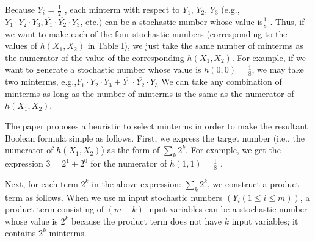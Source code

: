 \documentclass[10pt,conference]{IEEEtran}
\begin{document}
\par
Because $Y_i$ = $\frac{1}{2}$ , each minterm with respect to $Y_1$, $Y_2$, $Y_3$
(e.g., $Y_1 \cdot Y_2 \cdot Y_3, \overline{Y_1}\cdot\overline{Y_2}\cdot Y_3$, etc.) can be a stochastic number
whose value is$\frac{1}{8}$ . Thus, if we want to make each of the four
stochastic numbers (corresponding to the values of $h(X_1, X_2)$
in Table I), we just take the same number of minterms as the
numerator of the value of the corresponding $h(X_1, X_2)$. For
example, if we want to generate a stochastic number whose
value is $h(0, 0) = \frac{1}{8}$, we may take two minterms, e.g.,$Y_1\cdot Y_2 \cdot Y_3 + \overline{Y_1}\cdot\overline{Y_2}\cdot Y_3$ We can take any combination of minterms as
long as the number of minterms is the same as the numerator
of $h(X_1, X_2)$.

\par
The paper \cite{fifteen} proposes a heuristic to select minterms in
order to make the resultant Boolean formula simple as follows.
First, we express the target number (i.e., the numerator of
$h(X_1, X_2)$) as the form of $\sum_{k} 2^{k}$. For example, we get the
expression $3 = 2^1 + 2^0$ for the numerator of $h(1, 1) = \frac{1}{8}$ .

\par
Next, for each term $2^k$ in the above expression: $\sum_{k} 2^{k}$,
we construct a product term as follows. When we use m
input stochastic numbers $(Y_i (1 \leq i \leq m))$, a product term
consisting of $(m - k)$ input variables can be a stochastic
number whose value is $2^k$ because the product term does not
have $k$ input variables; it contains $2^k$ minterms.
\end{document}
